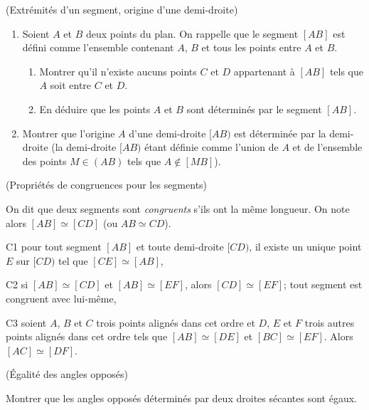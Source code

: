 \documentclass[a4paper,11pt,reqno]{amsart}
\begin{document}
\begin{exo} (Extrémités d'un segment, origine d'une demi-droite)

  \begin{enumerate}
    \item Soient $A$ et $B$ deux points du plan. On rappelle que le segment $[AB]$ est défini comme l'ensemble contenant $A$, $B$ et tous les points entre $A$ et $B$.
    \begin{enumerate}
      \item Montrer qu'il n'existe aucuns points $C$ et $D$ appartenant à $[AB]$ tels que $A$ soit entre $C$ et $D$.
      \item En déduire que les points $A$ et $B$ sont déterminés par le segment $[AB]$.
    \end{enumerate}
    \item Montrer que l'origine $A$ d'une demi-droite $[AB)$ est déterminée par la demi-droite (la demi-droite $[AB)$ étant définie comme l'union de $A$ et de l'ensemble des points $M \in (AB)$ tels que $A \notin [MB]$).
  \end{enumerate}
\end{exo}

\begin{exo} (Propriétés de congruences pour les segments)

On dit que deux segments sont \emph{congruents} s'ils ont la même longueur. On note alors $[AB]\simeq[CD]$ (ou $AB \simeq CD$).
  \begin{axioms}[leftmargin=2.8em]
    \item[C1] pour tout segment $[AB]$ et toute demi-droite $[CD)$, il existe un unique point $E$ sur $[CD)$ tel que $[CE]\simeq[AB]$,
    \item[C2] si $[AB]\simeq[CD]$ et $[AB]\simeq[EF]$, alors $[CD]\simeq[EF]$; tout segment est congruent avec lui-même,
    \item[C3] soient $A$, $B$ et $C$ trois points alignés dans cet ordre et $D$, $E$ et $F$ trois autres points alignés dans cet ordre tels que $[AB]\simeq [DE]$ et $[BC]\simeq[EF]$. Alors $[AC]\simeq[DF]$.
  \end{axioms}
\end{exo}

\begin{exo} (Égalité des angles opposés)

  Montrer que les angles opposés déterminés par deux droites sécantes sont égaux.
\end{exo}
\end{document}
